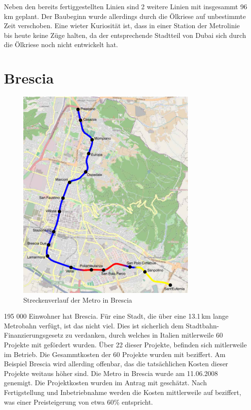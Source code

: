 Neben den bereits fertiggestellten Linien sind 2 weitere Linien mit
insgesammt 96\,km geplant. Der Baubeginn wurde allerdings durch die
Ölkriese auf unbestimmte Zeit verschoben. \cite{rtDubaiMetro} Eine
wieter Kuriosität ist, dass in einer Station der Metrolinie bis heute
keine Züge halten, da der entsprechende Stadtteil von Dubai sich durch
die Ölkriese noch nicht entwickelt hat.

\section{Brescia} 

\begin{figure}[h]
  \begin{center}
    \includegraphics[width=0.8\textwidth]{maps/Brescia.png}
    \caption{Streckenverlauf der Metro in Brescia}
  \end{center}
\end{figure}

195 000 Einwohner hat Brescia. Für eine Stadt, die über eine 13.1\,km lange Metrobahn verfügt, ist das nicht viel. Dies ist sicherlich dem Stadtbahn-Finanzierungsgesetz zu verdanken, durch welches in Italien mitlerweile 60 Projekte mit  gefördert wurden. Über 22 dieser Projekte, befinden sich mitlerweile im Betrieb. Die Gesammtkosten der 60 Projekte wurden mit  beziffert. Am Beispiel Brescia wird allerding offenbar, das die tatsächlichen Kosten dieser Projekte weitaus höher sind. Die Metro in Brescia wurde am 11.06.2008 genemigt. Die Projektkosten wurden im Antrag mit  geschätzt.\cite{brescSv} Nach Fertigstellung und Inbetriebnahme werden die Kosten mittlerweile auf  beziffert, was einer Preisteigerung von etwa 60\% entspricht\cite{brescRai}.  

